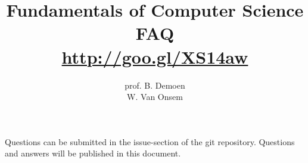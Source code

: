 \documentclass{article}
\title{Fundamentals of Computer Science\\FAQ\\\url{http://goo.gl/XS14aw}}
\author{prof. B. Demoen\\W. Van Onsem}
\date{}
\begin{document}
\maketitle
Questions can be submitted in the issue-section of the git repository. Questions and answers will be published in this document.

\begin{question}
\begin{answer}

\end{answer}
\end{question}
\end{document}
